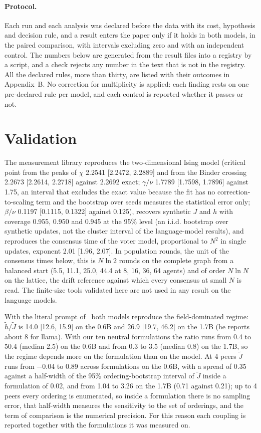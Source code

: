 \documentclass[11pt]{article}
\begin{document}
\paragraph{Protocol.} Each run and each analysis was declared before the data with its cost, hypothesis and decision rule, and a result enters the paper only if it holds in both models, in the paired comparison, with intervals excluding zero and with an independent control. The numbers below are generated from the result files into a registry by a script, and a check rejects any number in the text that is not in the registry. All the declared rules, more than thirty, are listed with their outcomes in Appendix~B. No correction for multiplicity is applied: each finding rests on one pre-declared rule per model, and each control is reported whether it passes or not.

\section{Validation}

The measurement library reproduces the two-dimensional Ising model
(critical point from the peaks of $\chi$ 2.2541 [2.2472, 2.2889] and
from the Binder crossing 2.2673 [2.2614, 2.2718] against 2.2692 exact;
$\gamma/\nu$ 1.7789 [1.7598, 1.7896] against 1.75, an interval that
excludes the exact value because the fit has no correction-to-scaling term
and the bootstrap over seeds measures the statistical error only;
$\beta/\nu$ 0.1197 [0.1115, 0.1322] against 0.125), recovers synthetic $J$
and $h$ with coverage 0.955, 0.950 and 0.945 at the 95\% level (an i.i.d.
bootstrap over synthetic updates, not the cluster interval of the
language-model results), and
reproduces the consensus time of the voter model, proportional to $N^2$ in
single updates, exponent 2.01 [1.96, 2.07]. In population rounds, the unit
of the consensus times below, this is $N\ln 2$ rounds on the complete
graph from a balanced start (5.5, 11.1, 25.0, 44.4 at 8, 16, 36, 64 agents) and of
order $N\ln N$ on the lattice, the drift reference against which every
consensus at small $N$ is read. The finite-size tools validated here are not used in any result on the language models.

With the literal prompt of~\cite{denobili2026} both models reproduce the
field-dominated regime: $\tilde h/\tilde J$ is 14.0 [12.6, 15.9] on the
0.6B and 26.9 [19.7, 46.2] on the 1.7B (he reports about 8 for llama).
With our ten neutral formulations the ratio runs from 0.4 to 50.4 (median
2.5) on the 0.6B and from 0.3 to 3.5 (median 0.8) on the 1.7B, so the regime depends more on the formulation than on the model. At 4 peers $\tilde J$
runs from $-0.04$ to 0.89 across formulations on the 0.6B, with a spread
of 0.35 against a half-width of the 95\% ordering-bootstrap interval of
$\tilde J$ inside a formulation of 0.02, and from 1.04 to 3.26 on the 1.7B
(0.71 against 0.21); up to 4 peers every ordering is enumerated, so inside
a formulation there is no sampling error, that half-width measures the
sensitivity to the set of orderings, and the term of comparison is the
numerical precision. For this reason each coupling is reported together with the formulations it was measured on.
\end{document}
